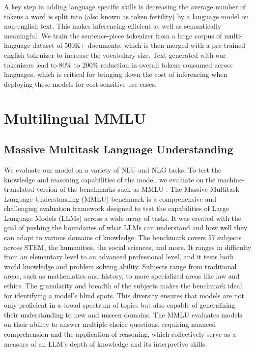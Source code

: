 \documentclass{article}
\begin{document}
A key step in adding language specific skills is decreasing the average number of tokens a word is split into (also known as token fertility) by a language model on non-english text. This makes inferencing efficient as well as semantically meaningful. We train the sentence-piece tokenizer from a large corpus of multi-language dataset of 500K+ documents, which is then merged with a pre-trained english tokenizer to increase the vocabulary size. Text generated with our tokenizers lead to 80\% to 200\% reduction in overall tokens consumed across languages, which is critical for bringing down the cost of inferencing when deploying these models for cost-sensitive use-cases.
 

\section{Multilingual MMLU}

\subsection{Massive Multitask Language Understanding}
We evaluate our model on a variety of NLU and NLG tasks. To test the knowledge and reasoning capabilities of the model, we evaluate on the machine-translated version of the benchmarks such as MMLU \citep{hendrycks2021measuring}. The Massive Multitask Language Understanding (MMLU) benchmark is a comprehensive and challenging evaluation framework designed to test the capabilities of Large Language Models (LLMs) across a wide array of tasks. It was created with the goal of pushing the boundaries of what LLMs can understand and how well they can adapt to various domains of knowledge. The benchmark covers 57 subjects across STEM, the humanities, the social sciences, and more. It ranges in difficulty from an elementary level to an advanced professional level, and it tests both world knowledge and problem solving ability. Subjects range from traditional areas, such as mathematics and history, to more specialized areas like law and ethics. The granularity and breadth of the subjects makes the benchmark ideal for identifying a model’s blind spots. This diversity ensures that models are not only proficient in a broad spectrum of topics but also capable of generalizing their understanding to new and unseen domains. The MMLU evaluates models on their ability to answer multiple-choice questions, requiring nuanced comprehension and the application of reasoning, which collectively serve as a measure of an LLM's depth of knowledge and its interpretive skills.
\end{document}
